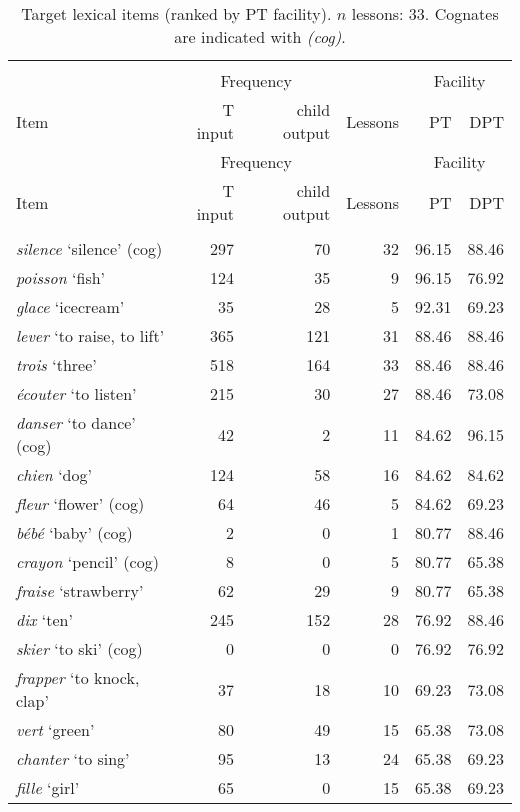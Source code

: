 \documentclass[output=paper]{langscibook}
\begin{document}
\begin{longtable}{lrrrrr}
\caption{Target lexical items (ranked by PT facility). $n$ lessons: 33. Cognates are indicated with \textit{(cog)}.\label{tab:mitchell:1}}\smallskip\\
    \lsptoprule
           & \multicolumn{2}{c}{Frequency} & & \multicolumn{2}{c}{Facility}\\\cmidrule(lr){2-3}\cmidrule(lr){5-6}
     Item  &  T input & child output & Lessons & PT & DPT\\\midrule\endfirsthead
     \midrule
           & \multicolumn{2}{c}{Frequency} & & \multicolumn{2}{c}{Facility}\\\cmidrule(lr){2-3}\cmidrule(lr){5-6}
     Item  &  T input & child output & Lessons & PT & DPT\\\midrule\endhead
     \endfoot\lspbottomrule\endlastfoot
     \multicolumn{6}{c}{Well learned words}\\\midrule
    \textit{silence} `silence' (cog) &297	& 70 &	32 &	96.15 &	88.46\\
    \textit{poisson} `fish' &	124 &	35	& 9	& 96.15 &	76.92\\
    \textit{glace} `icecream' &	35 &	28 &	5 &	92.31 &	69.23\\
    \textit{lever} `to raise, to lift' &	365 &	121 &	31 &	88.46 &	88.46\\
    \textit{trois} `three' &	518 &	164	& 33 &	88.46 &	88.46\\
    \textit{écouter} `to listen' &	215 &	30 &	27 &	88.46 &	73.08\\
    \textit{danser} `to dance' (cog) &	42 &	2 &	11	& 84.62 &	96.15\\
    \textit{chien} `dog'	& 124 &	58 &	16 &	84.62 &	84.62\\
    \textit{fleur} `flower' (cog) &	64 &	46 &	5 &	84.62 &	69.23\\
    \textit{bébé} `baby' (cog) &	2 &	0	& 1	& 80.77	& 88.46\\       
    \textit{crayon} `pencil' (cog)  &	8	& 0	& 5	& 80.77	& 65.38\\
    \textit{fraise} `strawberry'	& 62 &	29	& 9	& 80.77	& 65.38\\
    \textit{dix} `ten' &	245	& 152	& 28	& 76.92	& 88.46\\
    \textit{skier} `to ski' (cog)	& 0	& 0	& 0	& 76.92 &	76.92\\
    \textit{frapper} `to knock, clap' &	37 &	18 &	10	& 69.23	& 73.08\\
    \textit{vert} `green' &	80	 & 49	& 15	& 65.38 &	73.08\\
    \textit{chanter} `to sing' &	95 &	13 &	24	& 65.38 &	69.23\\
    \textit{fille} `girl'	& 65	& 0	& 15	& 65.38 &	69.23\\   
    

\end{longtable}
\end{document}
